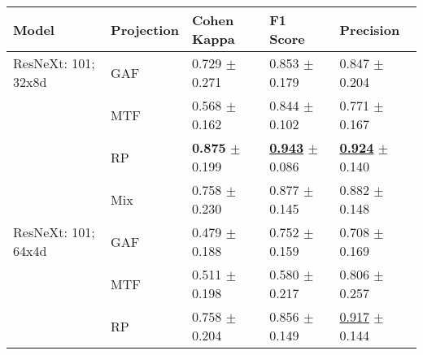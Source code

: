 
\begin{tabular}{lllll}
\toprule
Model & Projection & Cohen Kappa & F1 Score & Precision \\
\midrule
ResNeXt: 101; 32x8d & GAF & \textcolor[rgb]{0.3684210526,0.5000000000,0}{0.729} $\pm$ \textcolor[rgb]{0.9191588087,0.0808411913,0}{0.271} & \textcolor[rgb]{0.2474452555,0.5000000000,0}{0.853} $\pm$ \textcolor[rgb]{0.7128921737,0.2871078263,0}{0.179} & \textcolor[rgb]{0.3548387097,0.5000000000,0}{0.847} $\pm$ \textcolor[rgb]{0.5730017598,0.4269982402,0}{0.204} \\
 & MTF & \textcolor[rgb]{0.7751196172,0.2248803828,0}{0.568} $\pm$ \textcolor[rgb]{0.1258520059,0.5000000000,0}{0.162} & \textcolor[rgb]{0.2715328467,0.5000000000,0}{0.844} $\pm$ \textcolor[rgb]{0.1268636042,0.5000000000,0}{0.102} & \textcolor[rgb]{0.7096774194,0.2903225806,0}{0.771} $\pm$ \textcolor[rgb]{0.2805288473,0.5000000000,0}{0.167} \\
 & RP & \textbf{\textcolor[rgb]{0.0000000000,0.5000000000,0}{0.875}} $\pm$ \textcolor[rgb]{0.4000962485,0.5000000000,0}{0.199} & \underline{\textbf{\textcolor[rgb]{0.0000000000,0.5000000000,0}{0.943}}} $\pm$ \textcolor[rgb]{0.0055956460,0.5000000000,0}{0.086} & \underline{\textbf{\textcolor[rgb]{0.0000000000,0.5000000000,0}{0.924}}} $\pm$ \textcolor[rgb]{0.0605254734,0.5000000000,0}{0.140} \\
 & Mix & \textcolor[rgb]{0.2947368421,0.5000000000,0}{0.758} $\pm$ \textcolor[rgb]{0.6253424922,0.3746575078,0}{0.230} & \textcolor[rgb]{0.1806569343,0.5000000000,0}{0.877} $\pm$ \textcolor[rgb]{0.4522873410,0.5000000000,0}{0.145} & \textcolor[rgb]{0.1935483871,0.5000000000,0}{0.882} $\pm$ \textcolor[rgb]{0.1308023356,0.5000000000,0}{0.148} \\
ResNeXt: 101; 64x4d & GAF & \textcolor[rgb]{1.0000000000,0.0000000000,0}{0.479} $\pm$ \textcolor[rgb]{0.3203113470,0.5000000000,0}{0.188} & \textcolor[rgb]{0.5277372263,0.4722627737,0}{0.752} $\pm$ \textcolor[rgb]{0.5565692495,0.4434307505,0}{0.159} & \textcolor[rgb]{1.0000000000,0.0000000000,0}{0.708} $\pm$ \textcolor[rgb]{0.2918407482,0.5000000000,0}{0.169} \\
 & MTF & \textcolor[rgb]{0.9192982456,0.0807017544,0}{0.511} $\pm$ \textcolor[rgb]{0.3897912467,0.5000000000,0}{0.198} & \textcolor[rgb]{1.0000000000,0.0000000000,0}{0.580} $\pm$ \textcolor[rgb]{1.0000000000,0.0000000000,0}{0.217} & \textcolor[rgb]{0.5483870968,0.4516129032,0}{0.806} $\pm$ \textcolor[rgb]{1.0000000000,0.0000000000,0}{0.257} \\
 & RP & \textcolor[rgb]{0.2947368421,0.5000000000,0}{0.758} $\pm$ \textcolor[rgb]{0.4355254635,0.5000000000,0}{0.204} & \textcolor[rgb]{0.2400796284,0.5000000000,0}{0.856} $\pm$ \textcolor[rgb]{0.4833694125,0.5000000000,0}{0.149} & \underline{\textcolor[rgb]{0.0322580645,0.5000000000,0}{0.917}} $\pm$ \textcolor[rgb]{0.0976605228,0.5000000000,0}{0.144} \\

\end{tabular}

